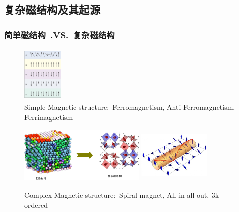 \documentclass[cjk,slidestop,compress,mathserif,blue]{beamer}
\begin{document}
\subsection{复杂磁结构及其起源}
\frame
{
	\frametitle{简单磁结构~\textrm{.VS.}~复杂磁结构}
\begin{figure}[h!]
\vspace*{-0.08in}
\centering
\includegraphics[height=1.05in,width=0.75in]{Figures/Magnet-simple.png}
\caption{\tiny \textrm{Simple Magnetic structure:~Ferromagnetism, Anti-Ferromagnetism, Ferrimagnetism}}%
\label{Fig:Simple-Magnet}
\end{figure}
\begin{figure}[h!]
\vspace*{-0.08in}
\centering
\includegraphics[height=1.05in,width=2.35in]{Figures/Magnet-complex-compound.png}
\hskip 0.5pt
\includegraphics[height=1.05in,width=1.35in]{Figures/Magnet-complex.png}
\caption{\tiny \textrm{Complex Magnetic structure:~Spiral magnet, All-in-all-out, 3k-ordered}}%
\label{Fig:Complex-Magnet}
\end{figure}
}
\end{document}
